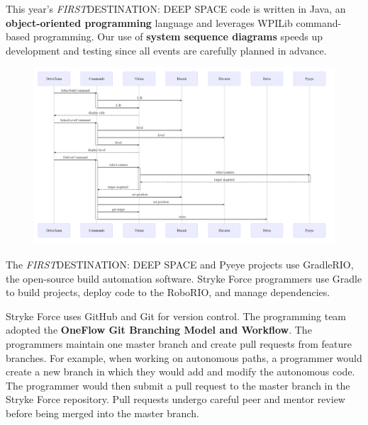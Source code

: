 \documentclass[10pt,tumble]{leaflet}
\begin{document}
This year’s \textit{FIRST}\textregistered DESTINATION: DEEP SPACE code is written in Java, an \textbf{object-oriented programming} language and leverages WPILib command-based programming. Our use of \textbf{system sequence diagrams} speeds up development and testing since all events are carefully planned in advance.

\begin{figure}[H]
	\centering
	\includegraphics[scale=0.18]{assets/mermaid}
\end{figure}

The \textit{FIRST}\textregistered DESTINATION: DEEP SPACE and Pyeye projects use GradleRIO, the open-source build automation software. Stryke Force programmers use Gradle to build projects, deploy code to the RoboRIO, and manage dependencies.

Stryke Force uses GitHub and Git for version control. The programming team adopted the \textbf{OneFlow Git Branching Model and Workflow}.  The programmers maintain one master branch and create pull requests from feature branches.  For example, when working on autonomous paths, a programmer would create a new branch in which they would add and modify the autonomous code.  The programmer would then submit a pull request to the master branch in the Stryke Force repository. Pull requests undergo careful peer and mentor review before being merged into the master branch.
\end{document}
